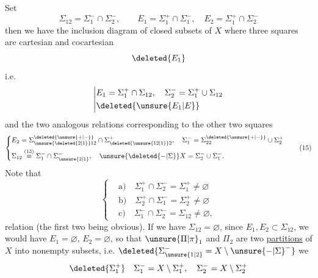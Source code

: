\begingroup
\makeatletter\tagsleft@true\makeatother
Set
\[
\Sigma_{12}=\Sigma_1^-\cap\Sigma_2^-,\qquad E_1=\Sigma_1^+\cap\Sigma_1^-,\quad E_2=\Sigma_1^+\cap\Sigma_2^-\tag*{(13)}
\]
then we have the inclusion diagram of closed subsets of $X$
\usetikzlibrary{decorations.pathmorphing}
where  three squares are cartesian and cocartesian
\[
\deleted{E_1}
\]
i.e.
\[
\left|\begin{aligned}
&E_1=\Sigma_1^+\cap\Sigma_{12},\quad\Sigma_2^-=\Sigma_1^+\cup\Sigma_{12}\\
&\deleted{\unsure{E_1|E}}
\end{aligned}\right.
\]
and the two analogous relations corresponding to the other two squares
\[
\left\{\begin{aligned}
&E_2=\Sigma_{\unsure{\deleted{2|1}}12}^{\deleted{\unsure{+|-}}}\cap\Sigma_{\deleted{\unsure{12|1}}2}^+,\quad \Sigma_1^-=\Sigma_{22}^{\deleted{\unsure{+|-}}}\cup\Sigma_2^+\\
&\Sigma_{12}\overset{(13)}{\equiv}\Sigma_1^-\cap\Sigma_{\unsure{2|1}}^-,\quad \unsure{\deleted{{-}|\Sigma}}X=\Sigma_2^-\cup\Sigma_1^-.
\end{aligned}\right.\tag*{(15)}
\]
Note that
\[
\left\{\begin{aligned}
&\text{a)}\quad\Sigma_1^+\cap\Sigma_2^-=\Sigma_1^+\ne\varnothing\\
&\text{b)}\quad\Sigma_2^+\cap\Sigma_1^-=\Sigma_2^+\ne\varnothing\\
&\text{c)}\quad\Sigma_1^-\cap\Sigma_2^-=\Sigma_{12}\ne\varnothing,
\end{aligned}\right.\tag*{(16)}
\]
   relation (the first two being obvious).
If we  have $\Sigma_{12}=\varnothing$, since $E_1,E_2\subset\Sigma_{12}$, we would have $E_1=\varnothing$, $E_2=\varnothing$, so that $\unsure{\Pi|\pi}_1$ and $\Pi_2$ are two \uline{partitions} of $X$ into nonempty subsets, i.e. $\deleted{\Sigma_{\unsure{1|2}}^- = X\setminus{\unsure{{-}|\Sigma}}^-}$ we 
\[
\deleted{\Sigma_1^+}\quad\Sigma_1^-=X\setminus\Sigma_1^+,\quad\Sigma_2^-=X\setminus\Sigma_2^+
\]
\endgroup

